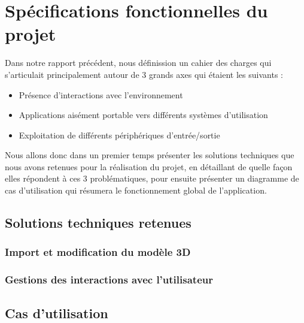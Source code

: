 \section{Spécifications fonctionnelles du projet}

Dans notre rapport précédent, nous définission un cahier des charges qui s'articulait principalement autour de 3 grands axes qui étaient les suivants : 
\begin{itemize}\renewcommand{\labelitemi}{$\bullet$}
\item Présence d'interactions avec l'environnement
\item Applications aisément portable vers différents systèmes d'utilisation
\item Exploitation de différents périphériques d'entrée/sortie
\end{itemize}
Nous allons donc dans un premier temps présenter les solutions techniques que nous avons retenues pour la réalisation du projet, en détaillant de quelle façon elles répondent à ces 3 problématiques, pour ensuite présenter un diagramme de cas d'utilisation qui résumera le fonctionnement global de l'application. 

\subsection{Solutions techniques retenues}

\subsubsection{Import et modification du modèle 3D}

\subsubsection{Gestions des interactions avec l'utilisateur}

\subsection{Cas d'utilisation}
